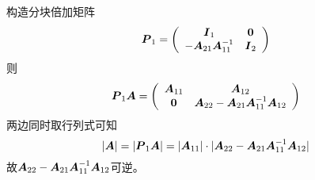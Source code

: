 \begin{jie}
  构造分块倍加矩阵
  $$
  \MP_1 = \left(
    \begin{array}{cc}
      \MI_1 & \M0\\
      -\MA_{21}\MA_{11}^{-1} & \MI_2
    \end{array}
  \right)
  $$
  则$$
  \MP_1\MA = \left(
    \begin{array}{cc}
      \MA_{11} & \MA_{12} \\
      \M0 & \MA_{22}-\MA_{21}\MA_{11}^{-1}\MA_{12}
    \end{array}
  \right)
  $$
  两边同时取行列式可知
  $$
  |\boldsymbol{A}| = |\boldsymbol{P}_1\boldsymbol{A}| = |\boldsymbol{A}_{11}|\cdot |\boldsymbol{A}_{22}-\boldsymbol{A}_{21}\boldsymbol{A}_{11}^{-1}\boldsymbol{A}_{12}|
  $$
  故$\boldsymbol{A}_{22}-\boldsymbol{A}_{21}\boldsymbol{A}_{11}^{-1}\boldsymbol{A}_{12}$可逆。
\end{jie}



